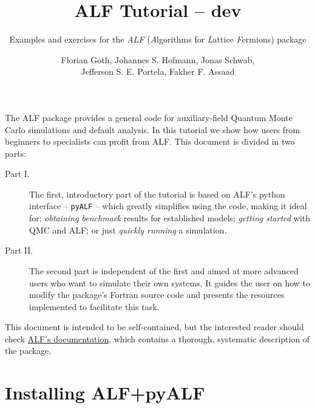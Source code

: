 \documentclass[10pt,modern]{scrartcl}
\numberwithin{exerciseitem}{exercise} %
\newcommand{\tutALFver}{dev}       %
\begin{document}
\title{ ALF Tutorial -- \tutALFver{} }
\subtitle{Examples and exercises for the \emph{ALF} (\emph{A}lgorithms for \emph{L}attice \emph{F}ermions) package} %
\author{Florian Goth,  Johannes S. Hofmann,  Jonas Schwab,\\  Jefferson S. E. Portela,  Fakher F. Assaad }
\maketitle


\tableofcontents

The ALF package provides a general code for auxiliary-field Quantum Monte Carlo simulations and default analysis. In this tutorial we show how users from beginners to specialists can profit from ALF. This document is divided in two parts:
\begin{description}
\item[Part I.] The first, introductory part of the tutorial is based on ALF's python interface -- \texttt{pyALF} -- which greatly simplifies using the code, making it ideal for: \emph{obtaining benchmark} results for established models; \emph{getting started} with QMC and ALF; or just \emph{quickly running} a simulation.
\item[Part II.] The second part is independent of the first and aimed at more advanced users who want to simulate their own systems. It guides the user on how to modify the package's Fortran source code and presents the resources implemented to facilitate this task.
\end{description}

This document is intended to be self-contained, but the interested reader should check \href{https://git.physik.uni-wuerzburg.de/ALF/ALF/-/jobs/artifacts/master/raw/Documentation/doc.pdf?job=create_doc}{ALF's documentation}, which contains a thorough, systematic description of the package.

\section{Installing ALF+pyALF}
\end{document}
